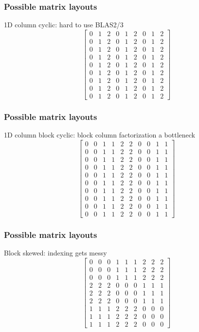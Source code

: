 \documentclass{beamer}
\begin{document}
\begin{frame}
  \frametitle{Possible matrix layouts}

  1D column cyclic: hard to use BLAS2/3
  \[
  \begin{bmatrix}
    0 & 1 & 2 & 0 & 1 & 2 & 0 & 1 & 2 \\
    0 & 1 & 2 & 0 & 1 & 2 & 0 & 1 & 2 \\
    0 & 1 & 2 & 0 & 1 & 2 & 0 & 1 & 2 \\
    0 & 1 & 2 & 0 & 1 & 2 & 0 & 1 & 2 \\
    0 & 1 & 2 & 0 & 1 & 2 & 0 & 1 & 2 \\
    0 & 1 & 2 & 0 & 1 & 2 & 0 & 1 & 2 \\
    0 & 1 & 2 & 0 & 1 & 2 & 0 & 1 & 2 \\
    0 & 1 & 2 & 0 & 1 & 2 & 0 & 1 & 2 \\
    0 & 1 & 2 & 0 & 1 & 2 & 0 & 1 & 2 
  \end{bmatrix}
  \]
\end{frame}


\begin{frame}
  \frametitle{Possible matrix layouts}

  1D column block cyclic: block column factorization a bottleneck
  \[
  \begin{bmatrix}
    0 & 0 & 1 & 1 & 2 & 2 & 0 & 0 & 1 & 1 \\
    0 & 0 & 1 & 1 & 2 & 2 & 0 & 0 & 1 & 1 \\
    0 & 0 & 1 & 1 & 2 & 2 & 0 & 0 & 1 & 1 \\
    0 & 0 & 1 & 1 & 2 & 2 & 0 & 0 & 1 & 1 \\
    0 & 0 & 1 & 1 & 2 & 2 & 0 & 0 & 1 & 1 \\
    0 & 0 & 1 & 1 & 2 & 2 & 0 & 0 & 1 & 1 \\
    0 & 0 & 1 & 1 & 2 & 2 & 0 & 0 & 1 & 1 \\
    0 & 0 & 1 & 1 & 2 & 2 & 0 & 0 & 1 & 1 \\
    0 & 0 & 1 & 1 & 2 & 2 & 0 & 0 & 1 & 1 \\
    0 & 0 & 1 & 1 & 2 & 2 & 0 & 0 & 1 & 1
  \end{bmatrix}
  \]
\end{frame}


\begin{frame}
  \frametitle{Possible matrix layouts}

  Block skewed: indexing gets messy
  \[
  \begin{bmatrix}
    0 & 0 & 0 & 1 & 1 & 1 & 2 & 2 & 2 \\
    0 & 0 & 0 & 1 & 1 & 1 & 2 & 2 & 2 \\
    0 & 0 & 0 & 1 & 1 & 1 & 2 & 2 & 2 \\
    2 & 2 & 2 & 0 & 0 & 0 & 1 & 1 & 1 \\
    2 & 2 & 2 & 0 & 0 & 0 & 1 & 1 & 1 \\
    2 & 2 & 2 & 0 & 0 & 0 & 1 & 1 & 1 \\
    1 & 1 & 1 & 2 & 2 & 2 & 0 & 0 & 0 \\
    1 & 1 & 1 & 2 & 2 & 2 & 0 & 0 & 0 \\
    1 & 1 & 1 & 2 & 2 & 2 & 0 & 0 & 0 
  \end{bmatrix}
  \]
\end{frame}
\end{document}
